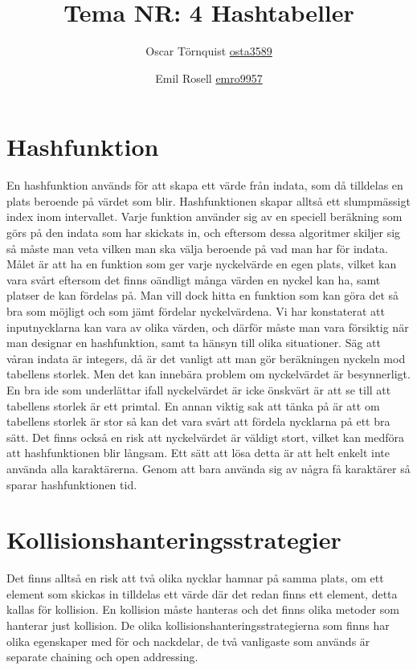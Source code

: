 \documentclass[a5paper,10pt,oneside]{article}
\title{Tema NR: 4 Hashtabeller}
\author{Oscar Törnquist \url{osta3589} \and Emil Rosell \url{emro9957}}
\begin{document}
\maketitle

\section*{Hashfunktion}
En hashfunktion används för att skapa ett värde från indata, som då tilldelas en plats beroende på värdet som blir. Hashfunktionen skapar alltså ett slumpmässigt index inom intervallet. Varje funktion använder sig av en speciell beräkning som görs på den indata som har skickats in, och eftersom dessa algoritmer skiljer sig så måste man veta vilken man ska välja beroende på vad man har för indata. Målet är att ha en funktion som ger varje nyckelvärde en egen plats, vilket kan vara svårt eftersom det finns oändligt många värden en nyckel kan ha, samt platser de kan fördelas på. Man vill dock hitta en funktion som kan göra det så bra som möjligt och som jämt fördelar nyckelvärdena. Vi har konstaterat att inputnycklarna kan vara av olika värden, och därför måste man vara försiktig när man designar en hashfunktion, samt ta hänsyn till olika situationer. Säg att våran indata är integers, då är det vanligt att man gör beräkningen nyckeln mod tabellens storlek. Men det kan innebära problem om nyckelvärdet är besynnerligt. En bra ide som underlättar ifall nyckelvärdet är icke önskvärt är att se till att tabellens storlek är ett primtal. En annan viktig sak att tänka på är att om tabellens storlek är stor så kan det vara svårt att fördela nycklarna på ett bra sätt. Det finns också en risk att nyckelvärdet är väldigt stort, vilket kan medföra att hashfunktionen blir långsam. Ett sätt att lösa detta är att helt enkelt inte använda alla karaktärerna. Genom att bara använda sig av några få karaktärer så sparar hashfunktionen tid.

\section*{Kollisionshanteringsstrategier}
Det finns alltså en risk att två olika nycklar hamnar på samma plats, om ett element som skickas in tilldelas ett värde där det redan finns ett element, detta kallas för kollision. En kollision måste hanteras och det finns olika metoder som hanterar just kollision. De olika kollisionshanteringsstrategierna som finns har olika egenskaper med för och nackdelar, de två vanligaste som används är separate chaining och open addressing.
\end{document}
